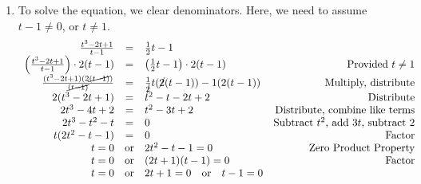 \documentclass{ximera}
\begin{document}
\begin{example}
\begin{explanation}
\begin{enumerate}
\[\begin{array}{rclr}
x & = & \frac{1 \pm \sqrt{5}}{2} & \text{Simplify} \\

\end{array}\]

We obtain two answers, $x = \frac{1 \pm \sqrt{5}}{2}$.  Neither of these are $0$ thus neither contradicts our assumption that $x \neq 0$.  The reader is invited to check both of these solutions.\footnote{The check relies on being able to `rationalize' the denominator  - a skill we haven't reviewed yet. (Come back after you've read Section \ref{rationalizingdenomandnumer} if you want to!)  Additionally, the positive solution to this equation is the famous \href{http://en.wikipedia.org/wiki/Golden_ratio}{\underline{Golden Ratio}}.}

\item  To solve the equation, we clear denominators.  Here, we need to assume $t-1 \neq 0$, or $t \neq 1$.\[ \begin{array}{rclr}

\frac{t^3-2t+1}{t-1} & = & \frac{1}{2}t-1 & \\  

\left(\frac{t^3-2t+1}{t-1}\right) \cdot 2(t-1) & = & \left( \frac{1}{2}t-1 \right) \cdot 2(t-1) & \text{Provided $t \neq 1$} \\  

\frac{(t^3-2t+1)(2\cancel{(t-1)})}{\cancel{(t-1)}}  & = & \frac{1}{\cancel{2}} t (\cancel{2}(t-1)) - 1(2(t-1))  & \text{Multiply, distribute} \\  

2(t^3-2t+1) & = & t^2 - t - 2t + 2 & \text{Distribute} \\  

2t^3 - 4t + 2 & = & t^2 -3t + 2 & \text{Distribute, combine like terms} \\  

2t^3 -t^2 - t & = & 0 & \text{Subtract $t^2$, add $3t$, subtract $2$}\\  

t(2t^2 -t - 1) & = & 0 & \text{Factor} \\  

t = 0 & \text{or} & 2t^2 - t - 1 = 0 & \text{Zero Product Property}\\  

t = 0 & \text{or} & (2t+1)(t-1) = 0 & \text{Factor}\\  

t = 0 & \text{or} & 2t+1 = 0 \quad \text{or} \quad t-1 = 0 &\\  


\end{array}\]
\end{enumerate}
\end{explanation}
\end{example}
\end{document}
